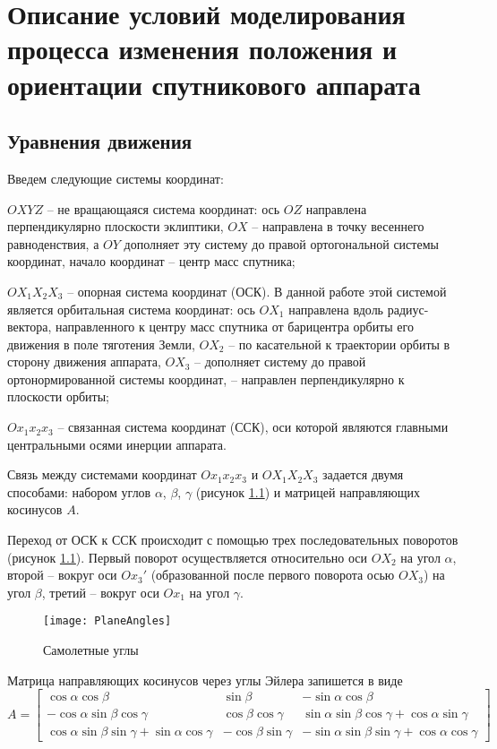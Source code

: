 \chapter{Описание условий моделирования процесса изменения положения и ориентации
спутникового аппарата}
\section{Уравнения движения}
\noindent\indent Введем следующие системы координат:\par
\noindent $OXYZ$ -- не вращающаяся система координат: ось $OZ$ направлена
перпендикулярно плоскости эклиптики, $OX$ -- направлена в точку весеннего
равноденствия, а $OY$ дополняет эту систему до правой ортогональной системы
координат, начало координат -- центр масс спутника;\par
\noindent $OX_1X_2X_3$ -- опорная система координат (ОСК). В данной работе
этой системой является орбитальная система координат: ось $OX_1$ направлена вдоль
радиус-вектора, направленного к центру масс спутника от барицентра орбиты его движения
 в поле тяготения Земли, $OX_2$ -- по касательной к траектории орбиты в сторону
движения аппарата, $OX_3$ -- дополняет систему до правой ортонормированной системы
координат, -- направлен перпендикулярно к плоскости орбиты;\par
\noindent $Ox_1x_2x_3$ -- связанная система координат (ССК), оси которой являются
главными центральными осями инерции аппарата.\par
    Связь между системами координат $Ox_1x_2x_3$ и $OX_1X_2X_3$ задается двумя
способами: набором углов $\alpha$, $\beta$, $\gamma$ (рисунок \ref{fig:KrilovAngles})
и матрицей направляющих косинусов $A$.\par
    Переход от ОСК к ССК происходит с помощью трех последовательных поворотов
(рисунок \ref{fig:KrilovAngles}). Первый поворот осуществляется относительно оси $OX_2$
на угол $\alpha$, второй -- вокруг оси $Ox_3'$ (образованной после первого поворота
осью $OX_3$) на угол $\beta$, третий -- вокруг оси $Ox_1$ на угол $\gamma$.
\begin{figure}[h]
  \centering
  \texttt{[image: PlaneAngles]}
  \caption{Самолетные углы}
  \label{fig:KrilovAngles}
\end{figure}\par
    Матрица направляющих косинусов через углы Эйлера запишется в виде
\begin{equation}
    A = \begin{bmatrix}
        \cos\alpha\cos\beta & \sin\beta & -\sin\alpha\cos\beta\\
        -\cos\alpha\sin\beta\cos\gamma & \cos\beta\cos\gamma & \sin\alpha\sin\beta\cos\gamma + \cos\alpha\sin\gamma \\
        \cos\alpha\sin\beta\sin\gamma + \sin\alpha\cos\gamma & -\cos\beta\sin\gamma & -\sin\alpha\sin\beta\sin\gamma + \cos\alpha\cos\gamma
    \end{bmatrix}
\end{equation}
